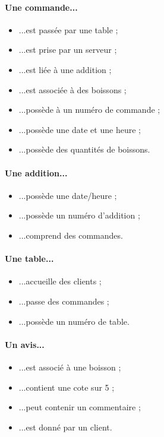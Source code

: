 \begin{minipage}[r]{0.5\textwidth}
  \paragraph{Une commande...}
	\begin{itemize}
		\item ...est passée par une table ;
		\item ...est prise par un serveur ;
		\item ...est liée à une addition ;
		\item ...est associée à des boissons ;
		\item ...possède à un numéro de commande ;
		\item ...possède une date et une heure ;
		\item ...possède des quantités de boissons.
	\end{itemize}

	\paragraph{Une addition...}
	\begin{itemize}
		\item ...possède une date/heure ;
		\item ...possède un numéro d’addition ;
		\item ...comprend des commandes.
	\end{itemize}
	
	\paragraph{Une table...}
	\begin{itemize}
		\item ...accueille des clients ;
		\item ...passe des commandes ;
		\item ...possède un numéro de table.
	\end{itemize}

	\paragraph{Un avis...}
	\begin{itemize}
		\item ...est associé à une boisson ;
		\item ...contient une cote sur 5 ;
		\item ...peut contenir un commentaire ;
		\item...est donné par un client.
	\end{itemize}
\end{minipage}

